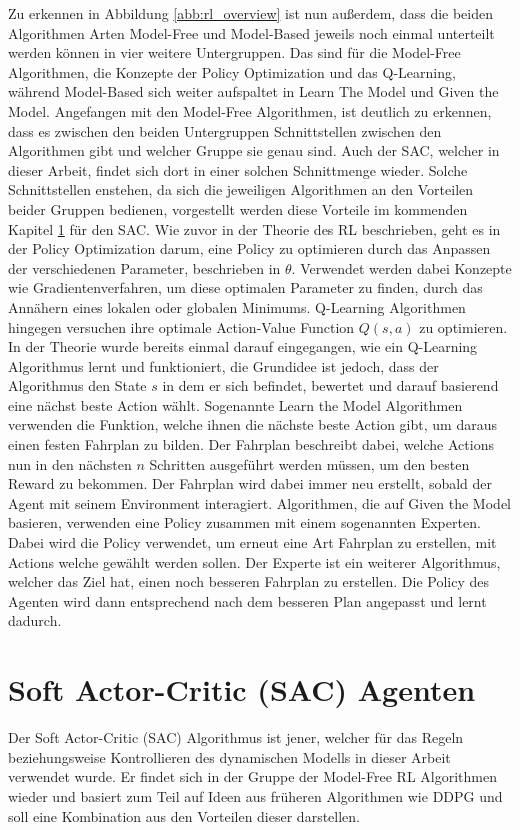 \documentclass[]{iat}
\begin{document}
Zu erkennen in Abbildung \ref{abb:rl_overview} ist nun außerdem, dass die beiden Algorithmen Arten Model-Free und Model-Based jeweils noch einmal unterteilt werden können in vier weitere Untergruppen. Das sind für die Model-Free Algorithmen, die Konzepte der Policy Optimization und das Q-Learning, während Model-Based sich weiter aufspaltet in Learn The Model und Given the Model. Angefangen mit den Model-Free Algorithmen, ist deutlich zu erkennen, dass es zwischen den beiden Untergruppen Schnittstellen zwischen den Algorithmen gibt und welcher Gruppe sie genau sind. Auch der SAC, welcher in dieser Arbeit, findet sich dort in einer solchen Schnittmenge wieder. Solche Schnittstellen enstehen, da sich die jeweiligen Algorithmen an den Vorteilen beider Gruppen bedienen, vorgestellt werden diese Vorteile im kommenden Kapitel \ref{sec:howto_sac} für den SAC. Wie zuvor in der Theorie des RL beschrieben, geht es in der Policy Optimization darum, eine Policy zu optimieren durch das Anpassen der verschiedenen Parameter, beschrieben in $\theta$. Verwendet werden dabei Konzepte wie Gradientenverfahren, um diese optimalen Parameter zu finden, durch das Annähern eines lokalen oder globalen Minimums. Q-Learning Algorithmen hingegen versuchen ihre optimale Action-Value Function $Q(s,a)$ zu optimieren. In der Theorie wurde bereits einmal darauf eingegangen, wie ein Q-Learning Algorithmus lernt und funktioniert, die Grundidee ist jedoch, dass der Algorithmus den State $s$ in dem er sich befindet, bewertet und darauf basierend eine nächst beste Action wählt. Sogenannte Learn the Model Algorithmen verwenden die Funktion, welche ihnen die nächste beste Action gibt, um daraus einen festen Fahrplan zu bilden. Der Fahrplan beschreibt dabei, welche Actions nun in den nächsten $n$ Schritten ausgeführt werden müssen, um den besten Reward zu bekommen. Der Fahrplan wird dabei immer neu erstellt, sobald der Agent mit seinem Environment interagiert. Algorithmen, die auf Given the Model basieren, verwenden eine Policy zusammen mit einem sogenannten Experten. Dabei wird die Policy verwendet, um erneut eine Art Fahrplan zu erstellen, mit Actions welche gewählt werden sollen. Der Experte ist ein weiterer Algorithmus, welcher das Ziel hat, einen noch besseren Fahrplan zu erstellen. Die Policy des Agenten wird dann entsprechend nach dem besseren Plan angepasst und lernt dadurch. \cite[]{SpinningUp2018} \cite[]{Sutton1998}

\section{Soft Actor-Critic (SAC) Agenten} \label{sec:howto_sac}
Der Soft Actor-Critic (SAC) Algorithmus ist jener, welcher für das Regeln beziehungsweise Kontrollieren des dynamischen Modells in dieser Arbeit verwendet wurde. Er findet sich in der Gruppe der Model-Free RL Algorithmen wieder und basiert zum Teil auf Ideen aus früheren Algorithmen wie DDPG und soll eine Kombination aus den Vorteilen dieser darstellen.
\end{document}
